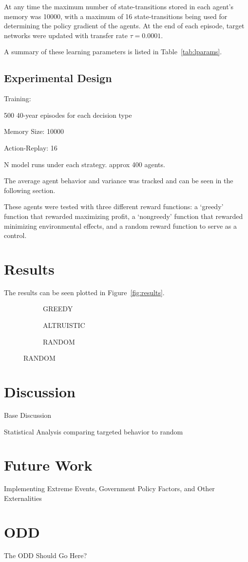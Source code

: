 \documentclass[12pt]{article}
\begin{document}
At any time the maximum number of state-transitions stored in each 
agent's memory was 10000,
with a maximum of 16 state-transitions being used for determining
the policy gradient of the agents. 
At the end of each episode, target networks were updated with transfer
rate $\tau = 0.0001$.

A summary of these learning parameters is listed in 
Table~\ref{tab:lparams}.

\subsection{Experimental Design}

Training:

500 40-year episodes for each decision type

Memory Size: 10000

Action-Replay: 16

N model runs under each strategy. approx 400 agents.

The average agent behavior and variance was tracked and can be seen in
the following section.

These agents were tested with three different reward functions:
a `greedy' function that rewarded maximizing profit,
a `nongreedy' function that rewarded minimizing environmental effects,
and a random reward function to serve as a control.

\section{Results}
\label{sec:results}

The results can be seen plotted in Figure~\ref{fig:results}.

\begin{figure}
\caption{Results}
\label{fig:results}
\begin{subfigure}{0.48\textwidth}
\caption{GREEDY}
\end{subfigure}

\begin{subfigure}{0.48\textwidth}
\caption{ALTRUISTIC}
\end{subfigure}

\begin{subfigure}{0.48\textwidth}
\caption{RANDOM}
\end{subfigure}
\end{figure}

\section{Discussion}

Base Discussion

Statistical Analysis comparing targeted behavior to random

\section{Future Work}

Implementing Extreme Events, Government Policy Factors, and Other 
Externalities




\appendix
\section{ODD}
\label{apx:odd}

The ODD Should Go Here?
\end{document}
